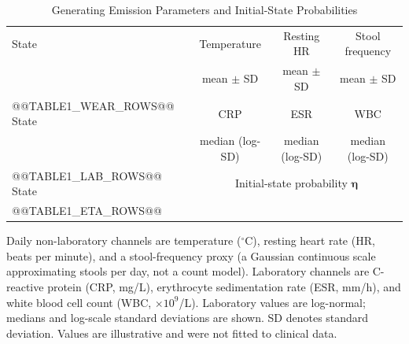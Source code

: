 \documentclass{ieeeaccess}
\newcommand{\vect}[1]{\bm{#1}}
\begin{document}
\begin{table}[t]
\caption{Generating Emission Parameters and Initial-State Probabilities}
\label{tab:emissions}
\centering
\footnotesize
\setlength{\tabcolsep}{3.2pt}
\begin{tabular}{lccc}
\toprule
State & Temperature & Resting HR & Stool frequency\\
 & mean $\pm$ SD & mean $\pm$ SD & mean $\pm$ SD\\
\midrule
@@TABLE1_WEAR_ROWS@@
\midrule
State & CRP & ESR & WBC\\
 & median (log-SD) & median (log-SD) & median (log-SD)\\
@@TABLE1_LAB_ROWS@@
\midrule
State & \multicolumn{3}{c}{Initial-state probability $\vect{\eta}$}\\
@@TABLE1_ETA_ROWS@@
\bottomrule
\end{tabular}
\begin{flushleft}\scriptsize Daily non-laboratory channels are temperature ($^\circ$C), resting heart rate (HR, beats per minute), and a stool-frequency proxy (a Gaussian continuous scale approximating stools per day, not a count model). Laboratory channels are C-reactive protein (CRP, mg/L), erythrocyte sedimentation rate (ESR, mm/h), and white blood cell count (WBC, $\times 10^9$/L). Laboratory values are log-normal; medians and log-scale standard deviations are shown. SD denotes standard deviation. Values are illustrative and were not fitted to clinical data.\end{flushleft}
\end{table}
\end{document}
